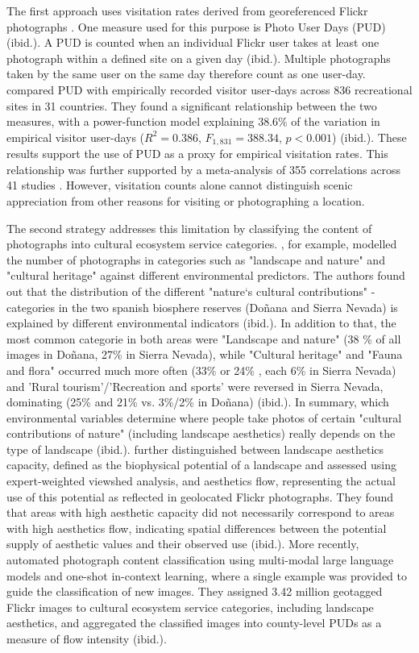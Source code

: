 \documentclass[11pt]{article}
\renewcommand{\_}{\textunderscore\allowbreak{}}
\begin{document}
The first approach uses visitation rates derived from georeferenced Flickr photographs \citep{wood_using_2013}. One measure used for this purpose is Photo User Days (PUD) (ibid.). A PUD is counted when an individual Flickr user takes at least one photograph within a defined site on a given day (ibid.). Multiple photographs taken by the same user on the same day therefore count as one user-day. \citet{wood_using_2013} compared PUD with empirically recorded visitor user-days across 836 recreational sites in 31 countries. They found a significant relationship between the two measures, with a power-function model explaining 38.6\% of the variation in empirical visitor user-days ($R^2 = 0.386$, $F_{1,831}=388.34$, $p<0.001$) (ibid.). These results support the use of PUD as a proxy for empirical visitation rates. This relationship was further supported by a meta-analysis of 355 correlations across 41 studies \citep{ghermandi_geolocated_2022}. However, visitation counts alone cannot distinguish scenic appreciation from other reasons for visiting or photographing a location.

The second strategy addresses this limitation by classifying the content of photographs into cultural ecosystem service categories. \citet{vaz_digital_2020}, for example, modelled the number of photographs in categories such as "landscape and nature" and "cultural heritage" against different environmental predictors. The authors found out that the distribution of the different "nature`s cultural contributions" -categories in the two spanish biosphere reserves (Doñana and Sierra Nevada) is explained by different environmental indicators (ibid.). In addition to that, the most common categorie in both areas were "Landscape and nature" (38 \% of all images in Doñana, 27\% in Sierra Nevada), while "Cultural heritage" and "Fauna and flora" occurred much more often (33\% or 24\% , each 6\% in Sierra Nevada) and 'Rural tourism'/'Recreation and sports' were reversed in Sierra Nevada, dominating (25\% and 21\% vs. 3\%/2\% in Doñana) (ibid.). In summary, which environmental variables determine where people take photos of certain "cultural contributions of nature" (including landscape aesthetics) really depends on the type of landscape (ibid.).\citet{langemeyer_mapping_2018} further distinguished between landscape aesthetics capacity, defined as the biophysical potential of a landscape and assessed using expert-weighted viewshed analysis, and aesthetics flow, representing the actual use of this potential as reflected in geolocated Flickr photographs. They found that areas with high aesthetic capacity did not necessarily correspond to areas with high aesthetics flow, indicating spatial differences between the potential supply of aesthetic values and their observed use (ibid.). More recently, \citet{liao_oneshot_2025} automated photograph content classification using multi-modal large language models and one-shot in-context learning, where a single example was provided to guide the classification of new images. They assigned 3.42 million geotagged Flickr images to cultural ecosystem service categories, including landscape aesthetics, and aggregated the classified images into county-level PUDs as a measure of flow intensity (ibid.).
\end{document}
